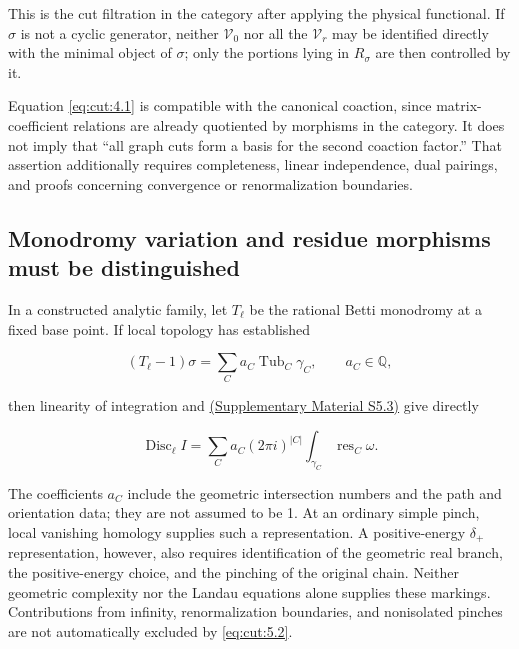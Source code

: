 \documentclass[11pt,a4paper,oneside]{article}
\theoremstyle{plain}
\theoremstyle{definition}
\theoremstyle{remark}
\numberwithin{equation}{section}
\newcommand{\otherref}[2]{\href{#1.pdf}{#2}}
\begin{document}
This is the cut filtration in the category after applying the physical functional. If \(\sigma \) is not a cyclic generator, neither \(\mathcal V_0\) nor all the \(\mathcal V_r\) may be identified directly with the minimal object of \(\sigma \); only the portions lying in \(R_\sigma \) are then controlled by it.

Equation \eqref{eq:cut:4.1} is compatible with the canonical coaction, since matrix-coefficient relations are already quotiented by morphisms in the category. It does not imply that ``all graph cuts form a basis for the second coaction factor.'' That assertion additionally requires completeness, linear independence, dual pairings, and proofs concerning convergence or renormalization boundaries.


\subsection{Monodromy variation and residue morphisms must be distinguished}\label{sec:cut:5}

In a constructed analytic family, let \(T_\ell \) be the rational Betti monodromy at a fixed base point. If local topology has established

\begin{equation}
(T_\ell-1)\sigma=\sum_C a_C\operatorname{Tub}_C\gamma_C,
 \qquad a_C\in\mathbb Q,                              \label{eq:cut:5.1}
\end{equation}

then linearity of integration and \otherref{feynman_periods_supplement_en}{(Supplementary Material S5.3)} give directly

\begin{equation}
\operatorname{Disc}_\ell I
     =\sum_C a_C(2\pi i)^{|C|}
                      \int_{\gamma_C}\operatorname{res}_C\omega.
                                                               \label{eq:cut:5.2}
\end{equation}

The coefficients \(a_C\) include the geometric intersection numbers and the path and orientation data; they are not assumed to be 1. At an ordinary simple pinch, local vanishing homology supplies such a representation. A positive-energy \(\delta _+\) representation, however, also requires identification of the geometric real branch, the positive-energy choice, and the pinching of the original chain. Neither geometric complexity nor the Landau equations alone supplies these markings. Contributions from infinity, renormalization boundaries, and nonisolated pinches are not automatically excluded by \eqref{eq:cut:5.2}.
\end{document}
